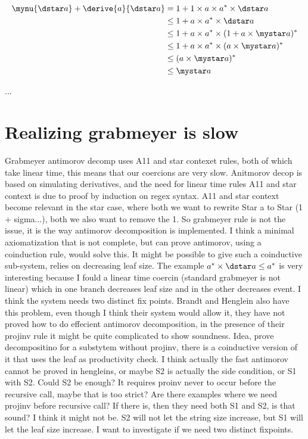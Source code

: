 \begin{align}
\mynu{\dstar a} + \derive{a}{\dstar a} &= 1 + 1 \times a \times a^* \times \dstar a\\
                                       &\leq 1 + a \times a^* \times \dstar a\\
                                       &\leq 1 + a \times a^* \times (1 +  a \times \mystar a)^*\\
                                       &\leq 1 + a \times a^* \times ( a \times \mystar a)^*\\
                                       &\leq ( a \times \mystar a)^*\\
                                       &\leq \mystar a
\end{align}





\newpage
\begin{example}
  ...
\end{example}
\section{Realizing grabmeyer is slow}
Grabmeyer antimorov decomp uses A11 and star contexet rules, both of which take linear time, this means that our coercions are very slow. Anitmorov decop is based on simulating derivatives, and the need for linear time rules A11 and star context is due to proof by induction on regex syntax. A11 and star context become relevant in the star case, where both we want to rewrite Star a to Star (1 + sigma...), both we also want to remove the 1. So grabmeyer rule is not the issue, it is the way antimorov decomposition is implemented. I think a minimal axiomatization that is not complete, but can prove antimorov, using a coinduction rule, would solve this. It might be possible to give such a coinductive sub-system, relies on decreasing leaf size. The example $a^* \times \dstar a \leq a^*$ is very interesting because I fould a linear time coercin (standard grabmeyer is not linear) which in one branch decreases leaf size and in the other decreases event. I think the system needs two distinct fix points. Brandt and Henglein also have this problem, even though I think their system would allow it, they have not proved how to do effecient antimorov decomposition, in the presence of their projinv rule it might be quite complicated to show soundness. Idea, prove decompositino for a substytem without projinv, there is a coinductive version of it that uses the leaf as productivity check. I think actually the fast antimorov cannot be proved in hengleins, or maybe S2 is actually the side condition, or S1 with S2. Could S2 be enough? It requires proinv never to occur before the recursive call, maybe that is too strict? Are there examples where we need projinv before recursive call? If there is, then they need both S1 and S2, is that sound? I think it might not be. S2 will not let the string size increase, but S1 will let the leaf size increase. I want to investigate if we need two distinct fixpoints.

